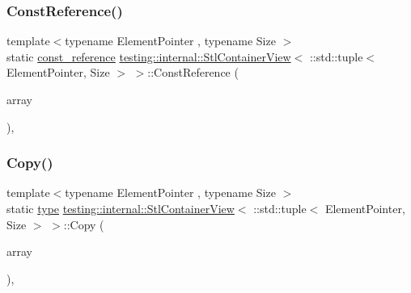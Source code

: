 \subsubsection{\texorpdfstring{ConstReference()}{ConstReference()}\hspace{0.1cm}{\footnotesize\ttfamily [2/2]}}
{\footnotesize\ttfamily template$<$typename Element\+Pointer , typename Size $>$ \\
static \mbox{\hyperlink{classtesting_1_1internal_1_1_stl_container_view_3_01_1_1std_1_1tuple_3_01_element_pointer_00_01_size_01_4_01_4_a0c2c9116c784cce6554d4aac9910482b}{const\+\_\+reference}} \mbox{\hyperlink{classtesting_1_1internal_1_1_stl_container_view}{testing\+::internal\+::\+Stl\+Container\+View}}$<$ \+::std\+::tuple$<$ Element\+Pointer, Size $>$ $>$\+::Const\+Reference (\begin{DoxyParamCaption}\item[{const \+::std\+::tuple$<$ Element\+Pointer, Size $>$ \&}]{array }\end{DoxyParamCaption})\hspace{0.3cm}{\ttfamily [inline]}, {\ttfamily [static]}}

\mbox{\label{classtesting_1_1internal_1_1_stl_container_view_3_01_1_1std_1_1tuple_3_01_element_pointer_00_01_size_01_4_01_4_acd52f4f1bbc1fe4341e8f60e6d5f0190}} 
\subsubsection{\texorpdfstring{Copy()}{Copy()}\hspace{0.1cm}{\footnotesize\ttfamily [1/2]}}
{\footnotesize\ttfamily template$<$typename Element\+Pointer , typename Size $>$ \\
static \mbox{\hyperlink{classtesting_1_1internal_1_1_stl_container_view_3_01_1_1std_1_1tuple_3_01_element_pointer_00_01_size_01_4_01_4_aaa0289cd65ef99ea632d2fb0ad5480eb}{type}} \mbox{\hyperlink{classtesting_1_1internal_1_1_stl_container_view}{testing\+::internal\+::\+Stl\+Container\+View}}$<$ \+::std\+::tuple$<$ Element\+Pointer, Size $>$ $>$\+::Copy (\begin{DoxyParamCaption}\item[{const \+::std\+::tuple$<$ Element\+Pointer, Size $>$ \&}]{array }\end{DoxyParamCaption})\hspace{0.3cm}{\ttfamily [inline]}, {\ttfamily [static]}}

